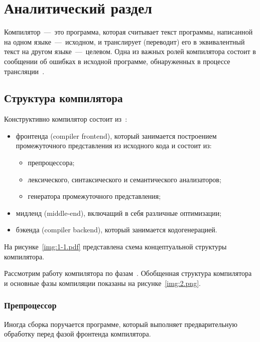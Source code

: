 \section{Аналитический раздел}

Компилятор~---~это программа, которая считывает текст программы, написанной на одном языке~---~исходном, и транслирует (переводит) его в эквивалентный текст на другом языке~---~целевом. Одна из важных ролей компилятора состоит в сообщении об ошибках в исходной программе, обнаруженных в процессе трансляции~\cite{aho2003}.

\subsection{Структура компилятора}

Конструктивно компилятор состоит из~\cite{vladimirtov2004struct,grune2012modern}:
\begin{itemize}
    \item фронтенда (compiler frontend), который занимается построением промежуточного представления из исходного кода и состоит из:
    \begin{itemize}
        \item препроцессора; 
        \item лексического, синтаксического и семантического анализаторов;
        \item генератора промежуточного представления;
    \end{itemize}
    \item мидленд (middle-end), включащий в себя различные оптимизации;
    \item бэкенда (compiler backend), который занимается кодогенерацией.
\end{itemize}

На рисунке~\ref{img:1-1.pdf} представлена схема концептуальной структуры компилятора.

Рассмотрим работу компилятора по фазам~\cite{serebrykov2001}. Обобщенная структура компилятора и основные фазы компиляции показаны на рисунке~\ref{img:2.png}.


\subsubsection{Препроцессор}

Иногда сборка поручается программе, который выполняет предварительную обработку перед фазой фронтенда компилятора. 

